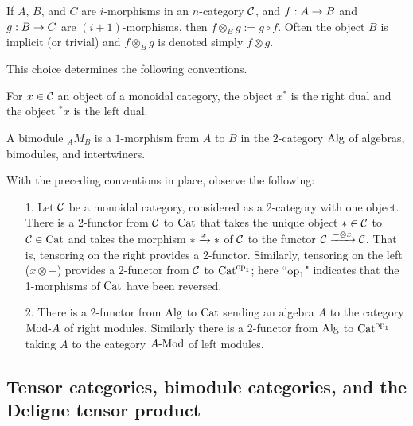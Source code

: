 \documentclass{amsart}
\begin{document}
\begin{definition} \label{def-tensorcomp}
If $A$, $B$, and $C$ are $i$-morphisms in an $n$-category $\mathcal C$, and $f: A \rightarrow B$ and $g: B \rightarrow C$ are $(i+1)$-morphisms, then $f \otimes_B g := g \circ f$.  Often the object $B$ is implicit (or trivial) and $f \otimes_B g$ is denoted simply $f \otimes g$.
\end{definition}

This choice determines the following conventions.
\begin{definition}
For $x \in \mathcal C$ an object of a monoidal category, the object $x^*$ is the right dual and the object ${}^*x$ is the left dual.
\end{definition}
\begin{definition}
A bimodule ${}_A M_B$ is a $1$-morphism from $A$ to $B$ in the $2$-category $\mathrm{Alg}$ of algebras, bimodules, and intertwiners.
\end{definition}

With the preceding conventions in place, observe the following:
\begin{itemize}
\item[1.] Let $\mathcal C$ be a monoidal category, considered as a 2-category with one object.  There is a 2-functor from $\mathcal C$ to $\mathrm{Cat}$ that takes the unique object $\ast \in \mathcal C$ to $\mathcal C \in \mathrm{Cat}$ and takes the morphism $\ast \xrightarrow{x} \ast$ of $\mathcal C$ to the functor $\mathcal C \xrightarrow{- \otimes x} \mathcal C$.  That is, tensoring on the right provides a 2-functor.  Similarly, tensoring on the left ($x \otimes -$) provides a 2-functor from $\mathcal C$ to $\mathrm{Cat}^{\mathrm{op}_1}$; here ``$\mathrm{op}_1$" indicates that the 1-morphisms of $\mathrm{Cat}$ have been reversed.  %
\item[2.] There is a 2-functor from $\mathrm{Alg}$ to $\mathrm{Cat}$ sending an algebra $A$ to the category $\Mod{}{A}$ of right modules.  Similarly there is a 2-functor from $\mathrm{Alg}$ to $\mathrm{Cat}^{\mathrm{op}_1}$ taking $A$ to the category $\Mod{A}{}$ of left modules.
\end{itemize}


\subsection{Tensor categories, bimodule categories, and the Deligne tensor product} \label{sec:tc-lincat}
\end{document}

